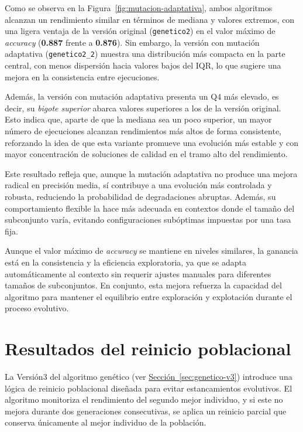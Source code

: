 Como se observa en la Figura~\ref{fig:mutacion-adaptativa}, ambos algoritmos alcanzan un rendimiento similar en términos de mediana y valores extremos,
con una ligera ventaja de la versión original (\texttt{genetico2}) en el valor máximo de \textit{accuracy} (\textbf{0.887} frente a \textbf{0.876}).
Sin embargo, la versión con mutación adaptativa (\texttt{genetico2\_2}) muestra una distribución más compacta en la parte central,
con menos dispersión hacia valores bajos del IQR, lo que sugiere una mejora en la consistencia entre ejecuciones.

Además, la versión con mutación adaptativa presenta un Q4 más elevado, es decir, su \textit{bigote superior} abarca valores superiores a los de la versión original.
Esto indica que, aparte de que la mediana sea un poco superior, un mayor número de ejecuciones alcanzan rendimientos más altos de forma consistente,
reforzando la idea de que esta variante promueve una evolución más estable y con mayor concentración de soluciones de calidad en el tramo alto del rendimiento.

Este resultado refleja que, aunque la mutación adaptativa no produce una mejora radical en precisión media,
sí contribuye a una evolución más controlada y robusta, reduciendo la probabilidad de degradaciones abruptas.
Además, su comportamiento flexible la hace más adecuada en contextos donde el tamaño del subconjunto varía,
evitando configuraciones subóptimas impuestas por una tasa fija.

Aunque el valor máximo de \textit{accuracy} se mantiene en niveles similares, la ganancia está en la consistencia y la eficiencia exploratoria,
ya que se adapta automáticamente al contexto sin requerir ajustes manuales para diferentes tamaños de subconjuntos.
En conjunto, esta mejora refuerza la capacidad del algoritmo para mantener el equilibrio entre exploración y explotación durante el proceso evolutivo.


\section{Resultados del reinicio poblacional}\label{sec:resultados-reinicio-poblacional}
La Versión3 del algoritmo genético (ver \hyperref[sec:genetico-v3]{Sección~\ref*{sec:genetico-v3}})
introduce una lógica de reinicio poblacional diseñada para evitar estancamientos evolutivos.
El algoritmo monitoriza el rendimiento del segundo mejor individuo, y si este no mejora durante dos generaciones consecutivas,
se aplica un reinicio parcial que conserva únicamente al mejor individuo de la población.

